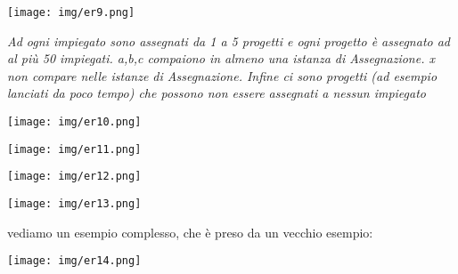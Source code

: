 \documentclass[a4paper,12pt, oneside]{book}
\begin{document}
\begin{center}
\texttt{[image: img/er9.png]}
\end{center}
\textit{Ad ogni impiegato sono assegnati da 1 a 5 progetti e ogni progetto è assegnato ad al più 50 impiegati. a,b,c compaiono in almeno una istanza di Assegnazione. x non compare nelle istanze di Assegnazione. Infine ci sono progetti (ad esempio lanciati da poco
tempo) che possono non essere assegnati a nessun
impiegato}\\
\begin{center}
\texttt{[image: img/er10.png]}
\end{center}
\begin{center}
\texttt{[image: img/er11.png]}
\end{center}
\begin{center}
\texttt{[image: img/er12.png]}
\end{center}
\begin{center}
\texttt{[image: img/er13.png]}
\end{center}
vediamo un esempio complesso, che è preso da un vecchio esempio:
\begin{center}
\texttt{[image: img/er14.png]}
\end{center}
\end{document}
